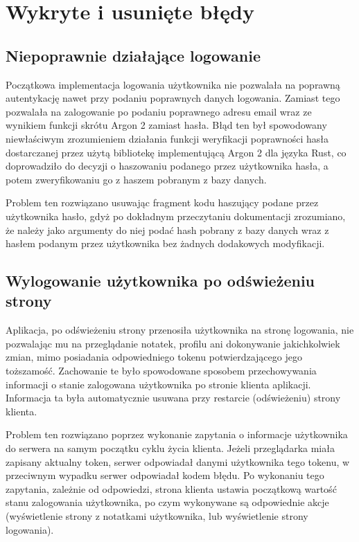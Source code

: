 \documentclass[a4paper,twoside,12pt]{book}
\begin{document}
\section{Wykryte i usunięte błędy}
\subsection{Niepoprawnie działające logowanie}
Początkowa implementacja logowania użytkownika nie pozwalała na poprawną
autentykację nawet przy podaniu poprawnych danych logowania. Zamiast tego
pozwalała na zalogowanie po podaniu poprawnego adresu email wraz ze wynikiem
funkcji skrótu Argon 2 zamiast hasła. Błąd ten był spowodowany niewłaściwym 
zrozumieniem działania funkcji weryfikacji poprawności hasła dostarczanej
przez użytą bibliotekę implementującą Argon 2 dla języka Rust, co doprowadziło
do decyzji o haszowaniu podanego przez użytkownika hasła, a potem 
zweryfikowaniu go z haszem pobranym z bazy danych.

Problem ten rozwiązano usuwając fragment kodu haszujący podane przez użytkownika
hasło, gdyż po dokładnym przeczytaniu dokumentacji zrozumiano, że należy jako
argumenty do niej podać hash pobrany z bazy danych wraz z hasłem podanym przez
użytkownika bez żadnych dodakowych modyfikacji.

\subsection{Wylogowanie użytkownika po odświeżeniu strony}
Aplikacja, po odświeżeniu strony przenosiła użytkownika na stronę logowania,
nie pozwalając mu na przeglądanie notatek, profilu ani dokonywanie jakichkolwiek
zmian, mimo posiadania odpowiedniego tokenu potwierdzającego jego toższamość.
Zachowanie te było spowodowane sposobem przechowywania informacji o stanie zalogowana
użytkownika po stronie klienta aplikacji. Informacja ta była automatycznie usuwana
przy restarcie (odświeżeniu) strony klienta.

Problem ten rozwiązano poprzez wykonanie zapytania o informacje użytkownika
do serwera na samym początku cyklu życia klienta. Jeżeli przeglądarka miała
zapisany aktualny token, serwer odpowiadał danymi użytkownika tego tokenu, 
w przeciwnym wypadku serwer odpowiadał kodem błędu. Po wykonaniu tego
zapytania, zależnie od odpowiedzi, strona klienta ustawia początkową
wartość stanu zalogowania użytkownika, po czym wykonywane są odpowiednie
akcje (wyświetlenie strony z notatkami użytkownika, lub wyświetlenie strony
logowania).
\end{document}

